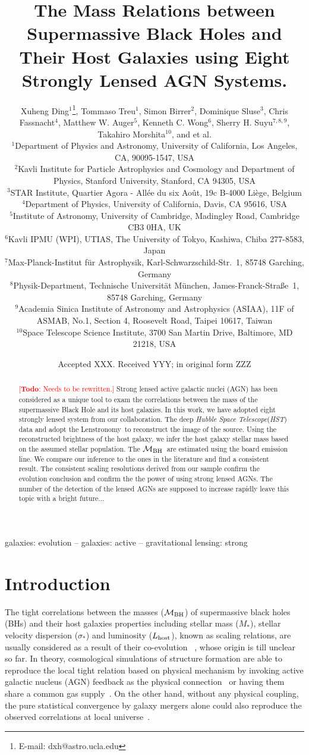 \documentclass[fleqn,usenatbib]{mnras}
\title[Mass relations by lensed AGN hosts]{The Mass Relations between Supermassive Black Holes and Their Host Galaxies using Eight Strongly Lensed AGN Systems.}
\author[X. Ding et al.]{
Xuheng Ding$^{1}$\thanks{E-mail: dxh@astro.ucla.edu},
Tommaso Treu$^{1}$,
Simon Birrer$^{2}$,
Dominique Sluse$^{3}$,\newauthor
Chris Fassnacht$^{4}$,
Matthew W. Auger$^{5}$,
Kenneth C. Wong$^{6}$,
Sherry H. Suyu$^{7,8,9}$,\newauthor
Takahiro Morshita$^{10}$,
and et al.
\\
$^{1}$Department of Physics and Astronomy, University of California, Los Angeles, CA, 90095-1547, USA\\
$^{2}$Kavli Institute for Particle Astrophysics and Cosmology and Department of Physics, Stanford University, Stanford, CA 94305, USA\\
$^{3}$STAR Institute, Quartier Agora - All\'ee du six Ao\^ut, 19c B-4000 Li\`ege, Belgium\\
$^{4}$Department of Physics, University of California, Davis, CA 95616, USA\\
$^{5}$Institute of Astronomy, University of Cambridge, Madingley Road, Cambridge CB3 0HA, UK\\
$^{6}$Kavli IPMU (WPI), UTIAS, The University of Tokyo, Kashiwa, Chiba 277-8583, Japan\\
$^{7}$Max-Planck-Institut f{\"u}r Astrophysik, Karl-Schwarzschild-Str.~1, 85748 Garching, Germany\\
$^{8}$Physik-Department, Technische Universit\"at M\"unchen, James-Franck-Stra\ss{}e~1, 85748 Garching, Germany\\
$^{9}$Academia Sinica Institute of Astronomy and Astrophysics (ASIAA), 11F of ASMAB, No.1, Section 4, Roosevelt Road, Taipei 10617, Taiwan\\
$^{10}$Space Telescope Science Institute, 3700 San Martin Drive, Baltimore, MD 21218, USA
}
\date{Accepted XXX. Received YYY; in original form ZZZ}
\newcommand{\hst}{{\it HST}}
\newcommand{\mbh}{$\mathcal M_{\rm BH}$}
\newcommand{\lhost}{$L_{\rm host}$}
\newcommand{\lenstronomy}{{\sc Lenstronomy}}
\newcommand{\mstar}{{$M_*$}}
\newcommand{\todo}[1]{\textcolor{red}{[{\bf Todo}: #1]}}
\begin{document}
\label{firstpage}
\pagerange{\pageref{firstpage}--\pageref{lastpage}}
\maketitle

\begin{abstract}
\todo{Needs to be rewritten.}
Strong lensed active galactic nuclei (AGN) has been considered as a unique tool to exam the correlations between the mass of the supermassive Black Hole and its host galaxies. In this work, we have adopted eight strongly lensed system from our collaboration. The deep {\it Hubble Space Telescope}(\hst) data and adopt the \lenstronomy\ to reconstruct the image of the source. Using the reconstructed brightness of the host galaxy, we infer the host galaxy stellar mass based on the assumed stellar population. 
The \mbh\ are estimated using the board emission line. We compare our inference to the ones in the literature and find a consistent result. The consistent scaling resolutions derived from our sample confirm the evolution conclusion and confirm the the power of using strong lensed AGNs. The number of the detection of the lensed AGNs are supposed to increase rapidly leave this topic with a bright future...
\end{abstract}

\begin{keywords}
galaxies: evolution -- galaxies: active -- gravitational lensing: strong
\end{keywords}


\section{Introduction}
The tight correlations between the masses (\mbh) of supermassive black holes (BHs) and their host galaxies properties including stellar mass (\mstar), stellar velocity dispersion ($\sigma_*$) and luminosity (\lhost), known as scaling relations, are usually considered as a result of their co-evolution ~\citep[e.g.,][]{Mag++98, F+M00, Geb++01b, M+H03, Gul++09,Beifi2012, H+R04, Gra++2011}, whose origin is till unclear so far. In theory, cosmological simulations of structure formation are able to reproduce the local tight relation based on physical mechanism by invoking active galactic nucleus (AGN) feedback as the physical connection~\citep{Springel2005, Hopkins2008, Matteo2008, DeG++15} or having them share a common gas supply~\citep{Cen2015, Menci2016}. On the other hand, without any physical coupling, the pure statistical convergence by galaxy mergers alone could also reproduce the observed correlations at local universe~\citep{Peng2007, Jahnke2011, Hirschmann2010}. 
\end{document}

